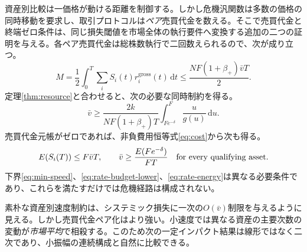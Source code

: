 \documentclass[11pt]{article}
\numberwithin{equation}{section}
\theoremstyle{definition}
\theoremstyle{remark}
\newcommand{\dd}{\,\mathrm{d}}
\begin{document}
資産別比較は一価格が動ける距離を制御する。しかし危機汎関数は多数の価格の同時移動を要求し、取引プロトコルは\emph{ペア}売買代金を数える。そこで売買代金と終端ゼロ条件は、同じ損失閾値を市場全体の執行要件へ変換する追加の二つの証明を与える。各ペア売買代金は総株数執行で二回数えられるので、次が成り立つ。
\begin{equation}\label{eq:rate-turnover}
 M=\frac12\int_0^T\sum_i S_i(t)r_i^{\mathrm{gross}}(t)\dd t
 \le\frac{NF(1+\beta_+)\bar v T}{2}.
\end{equation}
定理\ref{thm:resource}と合わせると、次の必要な同時制約を得る。
\begin{equation}\label{eq:rate-budget-lower}
 \boxed{\ \bar v\ge\frac{2k}{NF(1+\beta_+)T}
 \int_{Fe^{-\delta}}^F\frac{u}{g(u)}\dd u.\ }
\end{equation}
売買代金元帳がゼロであれば、非負費用恒等式\eqref{eq:cost}から次も得る。
\begin{equation}\label{eq:rate-energy}
 E(S_i(T))\le F\bar v T,\qquad
 \bar v\ge \frac{E(Fe^{-\delta})}{FT}
 \quad \hbox{for every qualifying asset.}
\end{equation}
下界\eqref{eq:min-speed}、\eqref{eq:rate-budget-lower}、\eqref{eq:rate-energy}は異なる必要条件であり、これらを満たすだけでは危機経路は構成されない。

素朴な資産別速度制約は、システミック損失に一次の$O(\bar v)$制限を与えるように見える。しかし売買代金ペア化はより強い。小速度では異なる資産の主要次数の変動が\emph{市場平均}で相殺する。このため次の一定インパクト結果は線形ではなく二次であり、小振幅の連続構成と自然に比較できる。
\end{document}
